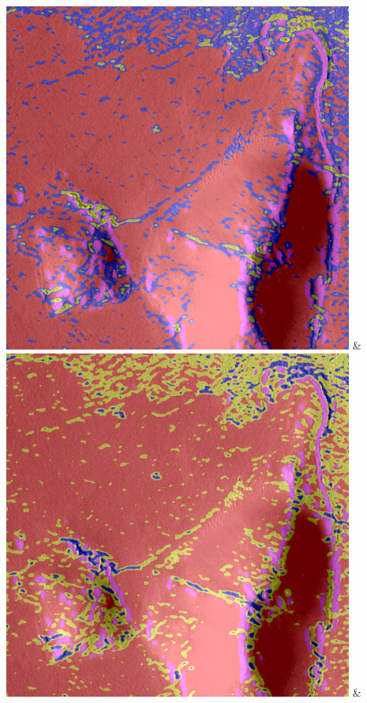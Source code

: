 \begin{table}[h!]
\begin{tabularx}{\textwidth}
		\includegraphics[width=0.9\linewidth]{images/gen/color_weight/p03_04.png_0.00.png} &
		\includegraphics[width=0.9\linewidth]{images/gen/color_weight/p03_04.png_0.33.png} &

\end{tabularx}
\end{table}

